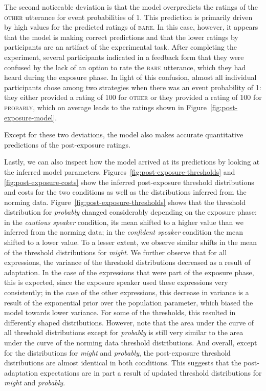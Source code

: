 \documentclass[lucida,biblatex]{sp} %
\newcommand{\figref}[1]{Figure~\ref{#1}}
\begin{document}
The second noticeable deviation is that the model overpredicts the ratings of the \textsc{other} utterance for event probabilities of 1. This prediction is primarily driven by high values for the predicted ratings of \textsc{bare}. In
this case, however, it appears that the model is making correct predictions and that the lower ratings by participants are an artifact of the experimental task. After completing the experiment, 
several participants indicated in a feedback form that they were confused by the lack of an option to rate the \textsc{bare} utterance, 
which they had heard during the exposure phase. In light of this confusion, almost all individual participants chose among two strategies when there was an event probability of 1: they either provided a rating of 100 for \textsc{other} 
or they provided a rating of 100 for \textsc{probably}, which on average leads to the ratings shown in \figref{fig:post-exposure-model}.

Except for these two deviations, the model also makes accurate quantitative predictions of the post-exposure ratings.

Lastly, we can also inspect how the model arrived at its predictions by looking at the inferred model parameters.  
Figures~\ref{fig:post-exposure-thresholds} and \ref{fig:post-exposure-costs} show the inferred
post-exposure threshold distributions and costs for the two conditions as well as the distributions inferred from the norming data.
Figure~\ref{fig:post-exposure-thresholds} shows that the threshold distribution for \textit{probably}
changed considerably depending on the exposure phase: in the \textit{cautious speaker} condition,
its mean shifted to a higher value than we inferred from the norming data; in the \textit{confident speaker} condition the mean 
shifted to a lower value. To a lesser extent, we observe similar shifts in the mean of the threshold
distributions for \textit{might}. We further observe that for all expressions, the variance of the threshold
distributions decreased as a result of adaptation. In the case of the expressions that were part of the exposure
phase, this is expected, since the exposure speaker used these expressions very consistently; in the case of the
other expressions, this decrease in variance is a result of the exponential prior over the population parameter,
which biased the model towards lower variance. For some of the thresholds, this resulted in differently shaped distributions.
However, note that the area under the curve of all threshold distributions except for \textit{probably} is still very similar to the 
area under the curve of the norming data threshold distributions. And overall, except for the distributions
for \textit{might} and \textit{probably}, the post-exposure threshold distributions are almost identical in both conditions.
This suggests that the post-adaptation expectations 
are in part a result of updated threshold distributions for \textit{might} and \textit{probably}.
\end{document}
